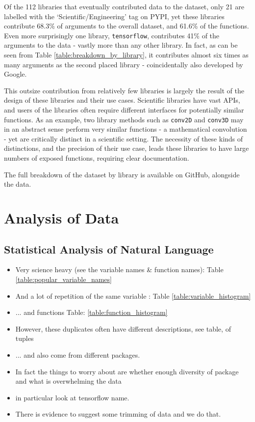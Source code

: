 Of the 112 libraries that eventually contributed data to the dataset, only 21 are labelled with the `Scientific/Engineering' tag on PYPI, yet these libraries contribute 68.3\% of arguments to the overall dataset, and 61.6\% of the functions. 
Even more surprisingly one library, \texttt{tensorflow}, contributes 41\% of the arguments to the data - vastly more than any other library.
In fact, as can be seen from Table \ref{table:breakdown_by_library}, it contributes almost six times as many arguments as the second placed library - coincidentally also developed by Google. 

This outsize contribution from relatively few libraries is largely the result of the design of these libraries and their use cases. 
Scientific libraries have vast APIs, and users of the libraries often require different interfaces for potentially similar functions. 
As an example, two library methods such as \texttt{conv2D} and \texttt{conv3D} may in an abstract sense perform very similar functions - a mathematical convolution - yet are critically distinct in a scientific setting.
The necessity of these kinds of distinctions, and the precision of their use case, leads these libraries to have large numbers of exposed functions, requiring clear documentation.

The full breakdown of the dataset by library is available on GitHub, alongside the data.

\section{Analysis of Data} %
\label{sec:analysis_of_data}


\subsection{Statistical Analysis of Natural Language} %
\label{sub:statistical_analysis_of_natural_language}


\begin{itemize}
    \item Very science heavy (see the variable names \& function names): Table \ref{table:popular_variable_names}
    \item And a lot of repetition of the same variable : Table \ref{table:variable_histogram}
    \item ... and functions Table: \ref{table:function_histogram}
    \item However, these duplicates often have different descriptions, see table, of tuples
    \item ... and also come from different packages.
    \item In fact the things to worry about are whether enough diversity of package and what is overwhelming the data
    \item in particular look at tensorflow name.
    \item There is evidence to suggest some trimming of data and we do that.
\end{itemize}


